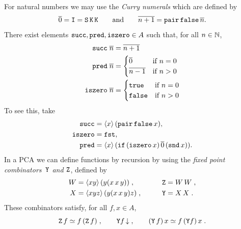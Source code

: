 %
For natural numbers we may use the
%
%
%
\label{sym:curry_numeral}%
%
\emph{Curry numerals} which are defined by 
%
\begin{equation*}
  \overline{0} = \mathtt{I} = \mathtt{S}\, \mathtt{K}\, \mathtt{K}
  \qquad\text{and}\qquad
  \overline{n+1} = \mathtt{pair} \, \mathtt{false} \, \overline{n}.
\end{equation*}
%
There exist elements
%
%
%
%
%
$\mathtt{succ}, \mathtt{pred}, \mathtt{iszero} \in A$ such that,
for all $n \in \mathbb{N}$,
%
\label{sym:succ}%
\label{sym:pred}%
\label{sym:iszero}%
%
\begin{align*}
  \mathtt{succ}\; \overline{n} &= \overline{n+1} \\
  \mathtt{pred}\; \overline{n} &= 
  \begin{cases}
    \overline{0} & \text{if $n = 0$} \\
    \overline{n-1} & \text{if $n > 0$}
  \end{cases}\\
  \mathtt{iszero}\; \overline{n} &=
  \begin{cases}
    \mathtt{true} & \text{if $n = 0$} \\
    \mathtt{false} & \text{if $n > 0$}
  \end{cases}
\end{align*}
%
To see this, take
%
\begin{align*}
  \mathtt{succ} &= \langle x \rangle\,(\mathtt{pair} \, \mathtt{false} \,x),\\ 
  \mathtt{iszero} &= \mathtt{fst},\\
  \mathtt{pred} &=
  \langle x \rangle\,(\mathtt{if}\, (\mathtt{iszero}\, x)\, \overline{0}\, (\mathtt{snd}\, x)).
\end{align*}
%
In a PCA we can define functions by recursion by using the
%
%
%
%
%
\label{sym:combY}%
\label{sym:combZ}%
\label{sym:combW}%
%
\emph{fixed point combinators~$\mathtt{Y}$ and $\mathtt{Z}$}, defined by
%
\begin{alignat*}{2}
  W &= \langle x y \rangle\,(y(x\, x\, y))\;, &
  \qquad
  \mathtt{Z} &= W\, W \;, \\
  X &= \langle x y z \rangle\,(y (x\, x\, y) z) \;, &
  \qquad
  \mathtt{Y} &= X\, X \;.
\end{alignat*}
%
These combinators satisfy, for all $f, x \in A$,
%
\begin{equation*}
  \mathtt{Z}\, f \simeq f\, (\mathtt{Z}\, f) \;,
  \qquad
  \mathtt{Y} f\,{\downarrow} \;,
  \qquad
  (\mathtt{Y}\, f)\, x \simeq f\, (\mathtt{Y} f)\, x \;.
\end{equation*}

